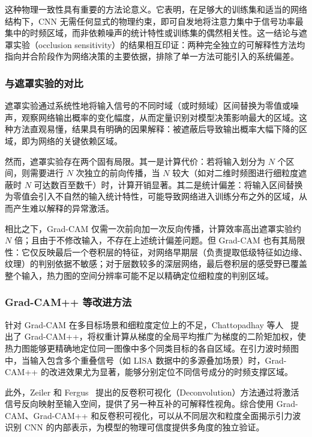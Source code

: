 这种物理一致性具有重要的方法论意义。它表明，在足够大的训练集和适当的网络结构下，CNN 无需任何显式的物理约束，即可自发地将注意力集中于信号功率最集中的时频区域，而非依赖噪声的统计特性或训练集的偶然相关性。这一结论与遮罩实验（occlusion sensitivity）的结果相互印证：两种完全独立的可解释性方法均指向并合阶段作为网络决策的主要依据，排除了单一方法可能引入的系统偏差。

\subsubsection*{与遮罩实验的对比}

遮罩实验通过系统性地将输入信号的不同时域（或时频域）区间替换为零值或噪声，观察网络输出概率的变化幅度，从而定量识别对模型决策影响最大的区域。这种方法直观易懂，结果具有明确的因果解释：被遮蔽后导致输出概率大幅下降的区域，即为网络的关键依赖区域。

然而，遮罩实验存在两个固有局限。其一是计算代价：若将输入划分为 $N$ 个区间，则需要进行 $N$ 次独立的前向传播，当 $N$ 较大（如对二维时频图进行细粒度遮蔽时 $N$ 可达数百至数千）时，计算开销显著。其二是统计偏差：将输入区间替换为零值会引入不自然的输入统计特性，可能导致网络进入训练分布之外的区域，从而产生难以解释的异常激活。

相比之下，Grad-CAM 仅需一次前向加一次反向传播，计算效率高出遮罩实验约 $N$ 倍；且由于不修改输入，不存在上述统计偏差问题。但 Grad-CAM 也有其局限性：它仅反映最后一个卷积层的特征，对网络早期层（负责提取低级特征如边缘、纹理）的判别依据不敏感；对于层数较多的深层网络，最后卷积层的感受野已覆盖整个输入，热力图的空间分辨率可能不足以精确定位细粒度的判别区域。

\subsubsection*{Grad-CAM++ 等改进方法}

针对 Grad-CAM 在多目标场景和细粒度定位上的不足，Chattopadhay 等人~\cite{Chattopadhay2018GradCAMpp} 提出了 Grad-CAM++，将权重计算从梯度的全局平均推广为梯度的二阶矩加权，使热力图能够更精确地定位同一图像中多个同类目标的各自区域。在引力波时频图中，当输入包含多个重叠信号（如 LISA 数据中的多源叠加场景）时，Grad-CAM++ 的改进效果尤为显著，能够分别定位不同信号成分的时频支撑区域。

此外，Zeiler 和 Fergus~\cite{Zeiler2014Deconv} 提出的反卷积可视化（Deconvolution）方法通过将激活信号反向映射至输入空间，提供了另一种互补的可解释性视角。综合使用 Grad-CAM、Grad-CAM++ 和反卷积可视化，可以从不同层次和粒度全面揭示引力波识别 CNN 的内部表示，为模型的物理可信度提供多角度的独立验证。

